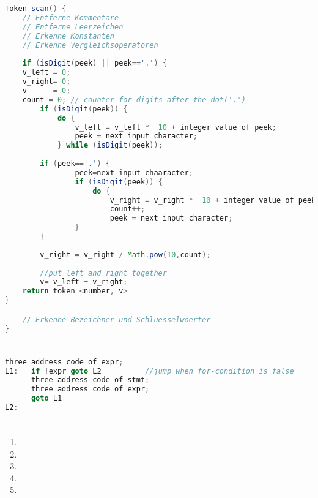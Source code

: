 \documentclass[a4paper,10pt]{scrartcl}
\begin{document}
\section{}
\begin{lstlisting}[language=Java,mathescape=True]
Token scan() {
    // Entferne Kommentare
    // Entferne Leerzeichen
    // Erkenne Konstanten
    // Erkenne Vergleichsoperatoren 
    
    if (isDigit(peek) || peek=='.') {
	v_left = 0;
	v_right= 0;
	v	   = 0;
	count = 0; // counter for digits after the dot('.')
		if (isDigit(peek)) {
			do {
				v_left = v_left *  10 + integer value of peek;
				peek = next input character;
			} while (isDigit(peek));
		
		if (peek=='.') {
				peek=next input chaaracter;
				if (isDigit(peek)) {
					do {
						v_right = v_right *  10 + integer value of peek;
						count++;
						peek = next input character;
				}
		}
		
		v_right = v_right / Math.pow(10,count);
		
		//put left and right together
		v= v_left + v_right;
	return token <number, v>
}

    // Erkenne Bezeichner und Schluesselwoerter
}
\end{lstlisting}
\section{}
\begin{lstlisting}[language=Java]
	  three address code of expr;
L1:   if !expr goto L2      	//jump when for-condition is false
      three address code of stmt;
	  three address code of expr;
      goto L1
L2:
\end{lstlisting}
\section{}
\begin{enumerate}
\item   
\item   
\item   
\item   
\item   
\end{enumerate}
\end{document}
